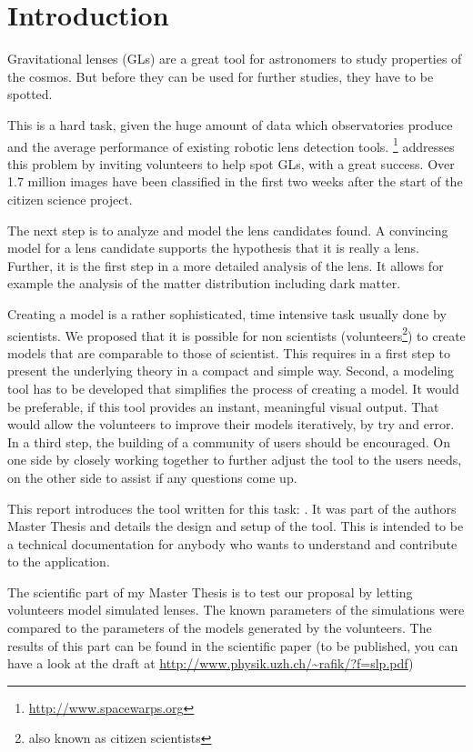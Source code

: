 \section{Introduction}

Gravitational lenses (GLs) are a great tool for astronomers to study properties of the cosmos.
But before they can be used for further studies, they have to be spotted.

This is a hard task, given the huge amount of data which observatories produce and the average performance of existing robotic lens detection tools.
\sw\footnote{\protect\url{http://www.spacewarps.org}} addresses this problem by inviting volunteers to help spot GLs, with a great success.
Over 1.7 million images have been classified in the first two weeks after the start of the citizen science project.

The next step is to analyze and model the lens candidates found.
A convincing model for a lens candidate supports the hypothesis that it is really a lens. Further, it is the first step in a more detailed analysis of the lens.
It allows for example the analysis of the matter distribution including dark matter.

Creating a model is a rather sophisticated, time intensive task usually done by scientists.
We proposed that it is possible for non scientists (volunteers\footnote{also known as citizen scientists}) to create models that are comparable to those of scientist. This requires in a first step to present the underlying theory in a compact and simple way.
Second, a modeling tool has to be developed that simplifies the process of creating a model.
It would be preferable, if this tool provides an instant, meaningful visual output.
That would allow the volunteers to improve their models iteratively, by try and error.
In a third step, the building of a community of users should be encouraged.
On one side by closely working together to further adjust the tool to the users needs, on the other side to assist if any questions come up.


This report introduces the tool written for this task: \spl.
It was part of the authors Master Thesis and details the design and setup of the tool.
This is intended to be a technical documentation for anybody who wants to understand and contribute to the application.

The scientific part of my Master Thesis is to test our proposal by letting volunteers model simulated lenses.
The known parameters of the simulations were compared to the parameters of the models generated by the volunteers.
The results of this part can be found in the scientific paper (to be published, you can have a look at the draft at \url{http://www.physik.uzh.ch/~rafik/?f=slp.pdf})

